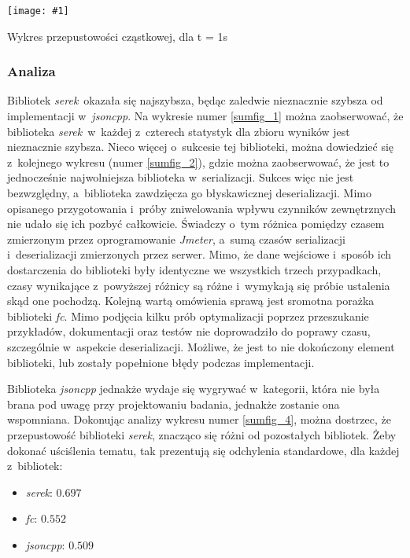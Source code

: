 \documentclass[12pt]{article}
\newcommand{\n}{\newline}
\newcommand{\putfig}[3]{
\begin{captioned}[H]
	\centering
	\texttt{[image: \#1]}
	\caption{#2}
	\label{#3}
	\medskip
\end{captioned}
}
\newcommand{\nonpl}[1]{{\it #1}}
\newcommand{\Jmeter}{\nonpl{Jmeter}\texttrademark}
\newcommand{\serek}{\nonpl{serek}}
\begin{document}
{{{				{
					\putfig{./charts/output_with_charts_as_images/throughput_per_library.png}{ Wykres przepustowości cząstkowej, dla \Delta t  = 1s}{sumfig_4}
				}
			}

			{
				\subsubsection{Analiza}

				Bibliotek \serek\  okazała się najszybsza, będąc zaledwie nieznacznie szybsza od implementacji w~\nonpl{jsoncpp}. Na wykresie numer \ref{sumfig_1}
				można zaobserwować, że biblioteka \serek\ w~każdej z~czterech statystyk dla zbioru wyników jest nieznacznie szybsza. Nieco więcej o~sukcesie tej biblioteki,
				można dowiedzieć się z~kolejnego wykresu (numer \ref{sumfig_2}), gdzie można zaobserwować, że jest to jednocześnie najwolniejsza biblioteka w~serializacji.
				Sukces więc nie jest bezwzględny, a~biblioteka zawdzięcza go błyskawicznej deserializacji. Mimo opisanego przygotowania i~próby zniwelowania wpływu
				czynników zewnętrznych nie udało się ich pozbyć całkowicie. Świadczy o~tym różnica pomiędzy czasem zmierzonym przez oprogramowanie \Jmeter, a~sumą czasów
				serializacji i~deserializacji zmierzonych przez serwer. Mimo, że dane wejściowe i~sposób ich dostarczenia do biblioteki były identyczne
				we wszystkich trzech przypadkach, czasy wynikające z~powyższej różnicy są różne i~wymykają się próbie ustalenia skąd one pochodzą. Kolejną wartą omówienia sprawą
				jest sromotna porażka biblioteki \nonpl{fc}. Mimo podjęcia kilku prób optymalizacji poprzez przeszukanie przykładów, dokumentacji
				oraz testów nie doprowadziło do poprawy czasu, szczególnie w~aspekcie deserializacji. Możliwe, że jest to nie dokończony element biblioteki, lub zostały popełnione
				błędy podczas implementacji.\n

				Biblioteka \nonpl{jsoncpp} jednakże wydaje się wygrywać w~kategorii, która nie była brana pod uwagę przy projektowaniu badania, jednakże zostanie
				ona wspomniana. Dokonując analizy wykresu numer \ref{sumfig_4}, można dostrzec, że przepustowość biblioteki \serek, znacząco się różni od pozostałych bibliotek.
				Żeby dokonać uściślenia tematu, tak prezentują się odchylenia standardowe, dla każdej z~bibliotek:

				{
					\begin{itemize}
						\setlength\itemsep{0mm}
						\item \serek: $0.697$
						\item \nonpl{fc}: $0.552$
						\item \nonpl{jsoncpp}: $0.509$
					\end{itemize}
				}

}}}
\end{document}
